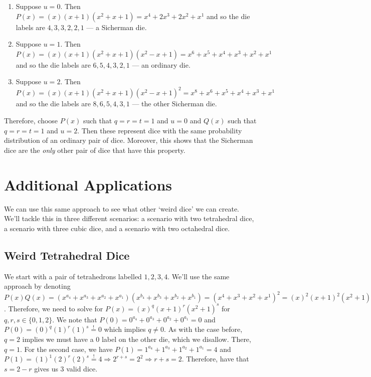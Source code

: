\documentclass[12pt]{report}
\begin{document}
\begin{enumerate}
\item Suppose $u=0$. Then $P(x)=(x)(x+1)(x^{2}+x+1)=x^{4}+2x^{3}+2x^{2}+x^{1}$ and so the die labels are $4,3,3,2,2,1$ --- a Sicherman die.
\item Suppose $u=1$. Then $P(x)=(x)(x+1)(x^{2}+x+1)(x^{2}-x+1)=x^{6}+x^{5}+x^{4}+x^{3}+x^{2}+x^{1}$ and so the die labels are $6,5,4,3,2,1$ --- an ordinary die.
\item Suppose $u=2$. Then $P(x)=(x)(x+1)(x^{2}+x+1)(x^{2}-x+1)^{2}=x^{8}+x^{6}+x^{5}+x^{4}+x^{3}+x^{1}$ and so the die labels are $8,6,5,4,3,1$ --- the other Sicherman die.
\end{enumerate}

Therefore, choose $P(x)$ such that $q=r=t=1$ and $u=0$ and $Q(x)$ such that $q=r=t=1$ and $u=2$. Then these
represent dice with the same probability distribution of an ordinary pair of dice. Moreover, this shows that
the Sicherman dice are the \textit{only} other pair of dice that have this property.

\section*{Additional Applications}
We can use this same approach to see what other `weird dice' we can create. We'll tackle this in three
different scenarios: a scenario with two tetrahedral dice, a scenario with three cubic dice, and a scenario
with two octahedral dice.

\subsection*{Weird Tetrahedral Dice}
We start with a pair of tetrahedrons labelled $1,2,3,4$. We'll use the same approach by denoting
$P(x)Q(x)=(x^{a_{4}}+x^{a_{3}}+x^{a_{2}}+x^{a_{1}})
(x^{b_{4}}+x^{b_{3}}+x^{b_{2}}+x^{b_{1}})=(x^{4}+x^{3}+x^{2}+x^{1})^{2}=(x)^{2}(x+1)^{2}(x^{2}+1)^{2}$.
Therefore, we need to solve for $P(x)=(x)^{q}(x+1)^{r}(x^{2}+1)^{s}$ for $q,r,s \in \{0,1,2\}$. We note that
$P(0)=0^{a_{4}}+0^{a_{3}}+0^{a_{2}}+0^{a_{1}}=0$ and $P(0)=(0)^{q}(1)^{r}(1)^{s} \stackrel{!}{=} 0$ which
implies $q \neq 0$. As with the case before, $q=2$ implies we must have a 0 label on the other die, which we
disallow. There, $q=1$. For the second case, we have $P(1)=1^{a_{4}}+1^{a_{3}}+1^{a_{2}}+1^{a_{1}}=4$ and
$P(1)=(1)^{1}(2)^{r}(2)^{s} \stackrel{!}{=} 4 \Rightarrow 2^{r+s}=2^{2} \Rightarrow r+s=2$. Therefore, have
that $s=2-r$ gives us 3 valid dice.
\end{document}
